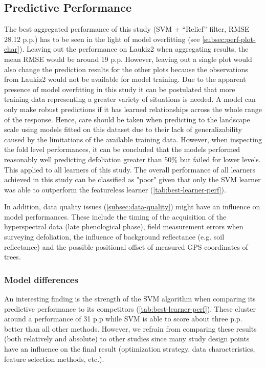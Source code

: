 \documentclass[remotesensing,article,submit,moreauthors,pdftex]{Definitions/mdpi}
\begin{document}
\subsection{Predictive Performance}

The best aggregated performance of this study (SVM + \enquote{Relief} filter, RMSE 28.12 p.p.) has to be seen in the light of model overfitting (see \autoref{subsec:perf-plot-char}).
Leaving out the performance on Laukiz2 when aggregating results, the mean RMSE would be around 19 p.p.
However, leaving out a single plot would also change the prediction results for the other plots because the observations from Laukiz2 would not be available for model training.
Due to the apparent presence of model overfitting in this study it can be postulated that more training data representing a greater variety of situations is needed.
A model can only make robust predictions if it has learned relationships across the whole range of the response.
Hence, care should be taken when predicting to the landscape scale using models fitted on this dataset due to their lack of generalizability caused by the limitations of the available training data.
However, when inspecting the fold level performances, it can be concluded that the models performed reasonably well predicting defoliation greater than 50\% but failed for lower levels.
This applied to all learners of this study.
The overall performance of all learners achieved in this study can be classified as "poor" given that only the SVM learner was able to outperform the featureless learner (\autoref{tab:best-learner-perf}).

In addition, data quality issues (\autoref{subsec:data-quality}) might have an influence on model performances.
These include the timing of the acquisition of the hyperspectral data (late phenological phase), field measurement errors when surveying defoliation, the influence of background reflectance (e.g. soil reflectance) and the possible positional offset of measured GPS coordinates of trees.

\subsubsection{Model differences}

An interesting finding is the strength of the SVM algorithm when comparing its predictive performance to its competitors (\autoref{tab:best-learner-perf}).
These cluster around a performance of 31 p.p while SVM is able to score about three p.p. better than all other methods.
However, we refrain from comparing these results (both relatively and absolute) to other studies since many study design points have an influence on the final result (optimization strategy, data characteristics, feature selection methods, etc.).
\end{document}
